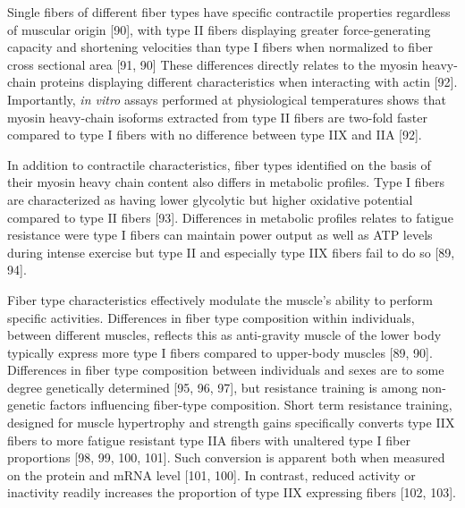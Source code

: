 \documentclass[twoside,10pt]{gihclass} %
\begin{document}
Single fibers of different fiber types have specific contractile properties regardless of muscular origin
{[}90{]},
with type II fibers displaying greater force-generating capacity and shortening velocities than type I fibers when normalized to fiber cross sectional area
{[}91, 90{]}
These differences directly relates to the myosin heavy-chain proteins displaying different characteristics when interacting with actin
{[}92{]}.
Importantly, \emph{in vitro} assays performed at physiological temperatures shows that myosin heavy-chain isoforms extracted from type II fibers are two-fold faster compared to type I fibers with no difference between type IIX and IIA
{[}92{]}.

In addition to contractile characteristics, fiber types identified on the basis of their myosin heavy chain content also differs in metabolic profiles.
Type I fibers are characterized as having lower glycolytic but higher oxidative potential compared to type II fibers
{[}93{]}.
Differences in metabolic profiles relates to fatigue resistance were type I fibers can maintain power output as well as ATP levels during intense exercise but type II and especially type IIX fibers fail to do so
{[}89, 94{]}.

Fiber type characteristics effectively modulate the muscle's ability to perform specific activities. Differences in fiber type composition within individuals, between different muscles, reflects this as anti-gravity muscle of the lower body typically express more type I fibers compared to upper-body muscles
{[}89, 90{]}.
Differences in fiber type composition between individuals and sexes are to some degree genetically determined
{[}95, 96, 97{]},
but resistance training is among non-genetic factors influencing fiber-type composition. Short term resistance training, designed for muscle hypertrophy and strength gains specifically converts type IIX fibers to more fatigue resistant type IIA fibers with unaltered type I fiber proportions
{[}98, 99, 100, 101{]}.
Such conversion is apparent both when measured on the protein and mRNA level
{[}101, 100{]}.
In contrast, reduced activity or inactivity readily increases the proportion of type IIX expressing fibers
{[}102, 103{]}.
\end{document}
